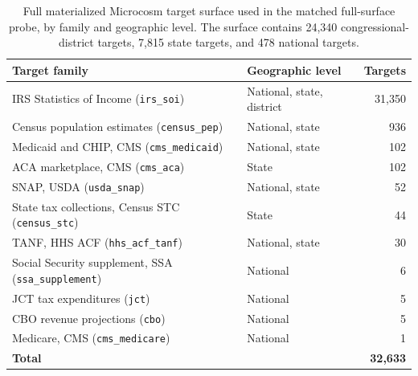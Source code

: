 \begin{table}[H]
\centering
{\tablefont
\begin{tabular}{@{}p{}l r@{}}
\toprule
Target family & Geographic level & Targets \\
\midrule
IRS Statistics of Income (\texttt{irs\_soi}) & National, state, district & 31{,}350 \\
Census population estimates (\texttt{census\_pep}) & National, state & 936 \\
Medicaid and CHIP, CMS (\texttt{cms\_medicaid}) & National, state & 102 \\
ACA marketplace, CMS (\texttt{cms\_aca}) & State & 102 \\
SNAP, USDA (\texttt{usda\_snap}) & National, state & 52 \\
State tax collections, Census STC (\texttt{census\_stc}) & State & 44 \\
TANF, HHS ACF (\texttt{hhs\_acf\_tanf}) & National, state & 30 \\
Social Security supplement, SSA (\texttt{ssa\_supplement}) & National & 6 \\
JCT tax expenditures (\texttt{jct}) & National & 5 \\
CBO revenue projections (\texttt{cbo}) & National & 5 \\
Medicare, CMS (\texttt{cms\_medicare}) & National & 1 \\
\midrule
\textbf{Total} & & \textbf{32{,}633} \\
\bottomrule
\end{tabular}
}
\caption{Full materialized Microcosm target surface used in the matched full-surface probe, by family and
geographic level. The surface contains 24{,}340 congressional-district targets, 7{,}815 state targets, and
478 national targets.}
\label{tab:target_subset}
\end{table}
